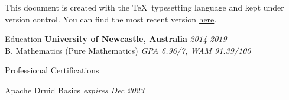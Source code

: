 \documentclass{resume} %
\begin{document}
This document is created with the \TeX \ typesetting language and kept under version control. You can find the most recent version \href{https://github.com/joegurr/resume/blob/main/resume.pdf}{here}.


\begin{rSection}{Education}
    {\bf University of Newcastle, Australia} \hfill {\em 2014-2019}
    \\ B. Mathematics (Pure Mathematics) \hfill {\em GPA 6.96/7, WAM 91.39/100}
\end{rSection}


\begin{rSection}{Professional Certifications}
    \item Apache Druid Basics \hfill {\em expires Dec 2023}
\end{rSection}

\end{document}
